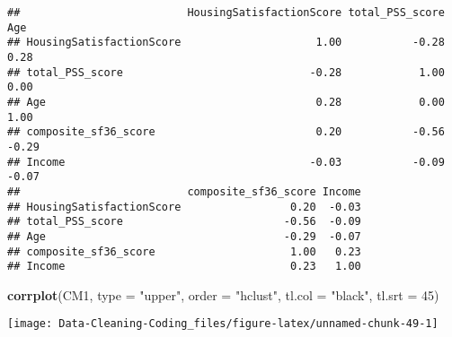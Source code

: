 \documentclass[]{article}
\newenvironment{Shaded}{\begin{snugshade}}{\end{snugshade}}
\newcommand{\DataTypeTok}[1]{\textcolor[rgb]{0.13,0.29,0.53}{#1}}
\newcommand{\DecValTok}[1]{\textcolor[rgb]{0.00,0.00,0.81}{#1}}
\newcommand{\KeywordTok}[1]{\textcolor[rgb]{0.13,0.29,0.53}{\textbf{#1}}}
\newcommand{\NormalTok}[1]{#1}
\newcommand{\StringTok}[1]{\textcolor[rgb]{0.31,0.60,0.02}{#1}}
\begin{document}
\begin{verbatim}
##                          HousingSatisfactionScore total_PSS_score   Age
## HousingSatisfactionScore                     1.00           -0.28  0.28
## total_PSS_score                             -0.28            1.00  0.00
## Age                                          0.28            0.00  1.00
## composite_sf36_score                         0.20           -0.56 -0.29
## Income                                      -0.03           -0.09 -0.07
##                          composite_sf36_score Income
## HousingSatisfactionScore                 0.20  -0.03
## total_PSS_score                         -0.56  -0.09
## Age                                     -0.29  -0.07
## composite_sf36_score                     1.00   0.23
## Income                                   0.23   1.00
\end{verbatim}

\begin{Shaded}
\begin{Highlighting}[]
\KeywordTok{corrplot}\NormalTok{(CM1, }\DataTypeTok{type =} \StringTok{"upper"}\NormalTok{, }\DataTypeTok{order =} \StringTok{"hclust"}\NormalTok{, }
         \DataTypeTok{tl.col =} \StringTok{"black"}\NormalTok{, }\DataTypeTok{tl.srt =} \DecValTok{45}\NormalTok{)}
\end{Highlighting}
\end{Shaded}

\texttt{[image: Data-Cleaning-Coding\_files/figure-latex/unnamed-chunk-49-1]}
\end{document}
